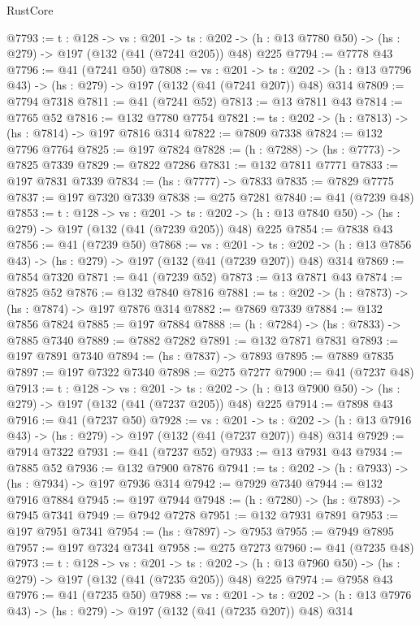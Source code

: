 \begin{lexlean}{RustCore}
\begin{coremodule}
@7793 := {t : @128} ->
  {vs : @201} ->
  {ts : @202} -> (h : @13 @7780 @50) -> (hs : @279) -> @197 (@132 (@41 (@7241 @205)) @48) @225
@7794 := @7778 @43
@7796 := @41 (@7241 @50)
@7808 := {vs : @201} ->
  {ts : @202} -> (h : @13 @7796 @43) -> (hs : @279) -> @197 (@132 (@41 (@7241 @207)) @48) @314
@7809 := @7794 @7318
@7811 := @41 (@7241 @52)
@7813 := @13 @7811 @43
@7814 := @7765 @52
@7816 := @132 @7780 @7754
@7821 := {ts : @202} -> (h : @7813) -> (hs : @7814) -> @197 @7816 @314
@7822 := @7809 @7338
@7824 := @132 @7796 @7764
@7825 := @197 @7824
@7828 := (h : @7288) -> (hs : @7773) -> @7825 @7339
@7829 := @7822 @7286
@7831 := @132 @7811 @7771
@7833 := @197 @7831 @7339
@7834 := (hs : @7777) -> @7833
@7835 := @7829 @7775
@7837 := @197 @7320 @7339
@7838 := @275 @7281
@7840 := @41 (@7239 @48)
@7853 := {t : @128} ->
  {vs : @201} ->
  {ts : @202} -> (h : @13 @7840 @50) -> (hs : @279) -> @197 (@132 (@41 (@7239 @205)) @48) @225
@7854 := @7838 @43
@7856 := @41 (@7239 @50)
@7868 := {vs : @201} ->
  {ts : @202} -> (h : @13 @7856 @43) -> (hs : @279) -> @197 (@132 (@41 (@7239 @207)) @48) @314
@7869 := @7854 @7320
@7871 := @41 (@7239 @52)
@7873 := @13 @7871 @43
@7874 := @7825 @52
@7876 := @132 @7840 @7816
@7881 := {ts : @202} -> (h : @7873) -> (hs : @7874) -> @197 @7876 @314
@7882 := @7869 @7339
@7884 := @132 @7856 @7824
@7885 := @197 @7884
@7888 := (h : @7284) -> (hs : @7833) -> @7885 @7340
@7889 := @7882 @7282
@7891 := @132 @7871 @7831
@7893 := @197 @7891 @7340
@7894 := (hs : @7837) -> @7893
@7895 := @7889 @7835
@7897 := @197 @7322 @7340
@7898 := @275 @7277
@7900 := @41 (@7237 @48)
@7913 := {t : @128} ->
  {vs : @201} ->
  {ts : @202} -> (h : @13 @7900 @50) -> (hs : @279) -> @197 (@132 (@41 (@7237 @205)) @48) @225
@7914 := @7898 @43
@7916 := @41 (@7237 @50)
@7928 := {vs : @201} ->
  {ts : @202} -> (h : @13 @7916 @43) -> (hs : @279) -> @197 (@132 (@41 (@7237 @207)) @48) @314
@7929 := @7914 @7322
@7931 := @41 (@7237 @52)
@7933 := @13 @7931 @43
@7934 := @7885 @52
@7936 := @132 @7900 @7876
@7941 := {ts : @202} -> (h : @7933) -> (hs : @7934) -> @197 @7936 @314
@7942 := @7929 @7340
@7944 := @132 @7916 @7884
@7945 := @197 @7944
@7948 := (h : @7280) -> (hs : @7893) -> @7945 @7341
@7949 := @7942 @7278
@7951 := @132 @7931 @7891
@7953 := @197 @7951 @7341
@7954 := (hs : @7897) -> @7953
@7955 := @7949 @7895
@7957 := @197 @7324 @7341
@7958 := @275 @7273
@7960 := @41 (@7235 @48)
@7973 := {t : @128} ->
  {vs : @201} ->
  {ts : @202} -> (h : @13 @7960 @50) -> (hs : @279) -> @197 (@132 (@41 (@7235 @205)) @48) @225
@7974 := @7958 @43
@7976 := @41 (@7235 @50)
@7988 := {vs : @201} ->
  {ts : @202} -> (h : @13 @7976 @43) -> (hs : @279) -> @197 (@132 (@41 (@7235 @207)) @48) @314

\end{coremodule}
\end{lexlean}
